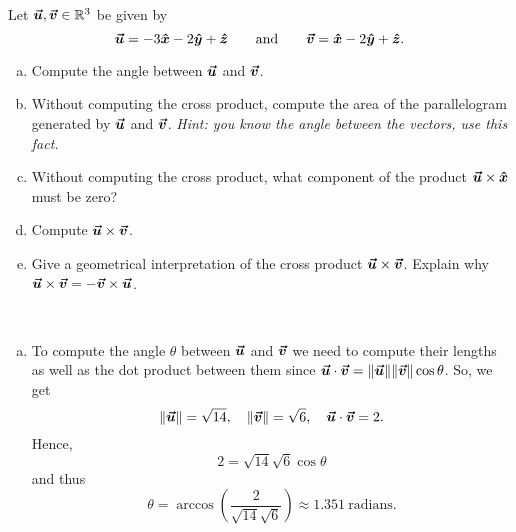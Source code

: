 \documentclass[12pt]{article} %
\begin{document}
\newpage
\begin{problem}
Let $\vecu,\vecv \in \R^3$ be given by
\[
\vecu = -3\xhat -2\yhat + \zhat \qquad \textrm{and} \qquad \vecv = \xhat -2\yhat +\zhat.
\]
\begin{enumerate}[(a)]
    \item Compute the angle between $\vecu$ and $\vecv$.
    \item Without computing the cross product, compute the area of the parallelogram generated by $\vecu$ and $\vecv$. \emph{Hint: you know the angle between the vectors, use this fact.}
    \item Without computing the cross product, what component of the product $\vecu\times\xhat$ must be zero? 
    \item Compute $\vecu\times \vecv$.
    \item Give a geometrical interpretation of the cross product $\vecu\times \vecv$. Explain why $\vecu\times \vecv = -\vecv \times \vecu$.
\end{enumerate}
\end{problem}
\begin{solution}~
    \begin{enumerate}[(a)]
        \item To compute the angle $\theta$ between $\vecu$ and $\vecv$ we need to compute their lengths as well as the dot product between them since $\vecu \cdot \vecv = \|\vecu\|\|\vecv\| \cos \theta$.  So, we get
        \[
            \|\vecu\| = \sqrt{14},\quad \|\vecv\| = \sqrt{6}, \quad \vecu\cdot \vecv = 2.
        \]
        Hence,
        \[
        2 = \sqrt{14}\sqrt{6} \cos \theta
        \]
        and thus
        \[
            \theta = \arccos \left(\frac{2}{\sqrt{14}\sqrt{6}} \right) \approx 1.351 ~\textrm{radians}.
        \]
    \end{enumerate}
\end{solution}
\end{document}
